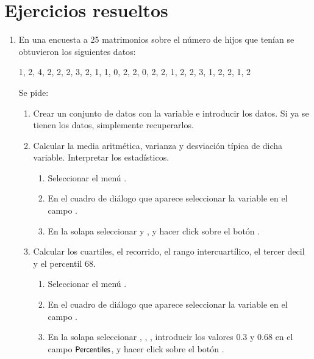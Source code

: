 \section{Ejercicios resueltos}
\begin{enumerate}[leftmargin=*]
\item En una encuesta a 25 matrimonios sobre el número de hijos que tenían se obtuvieron los siguientes datos:
\begin{center}
1, 2, 4, 2, 2, 2, 3, 2, 1, 1, 0, 2, 2, 0, 2, 2, 1, 2, 2, 3, 1, 2, 2, 1, 2
\end{center}
Se pide:
\begin{enumerate}
\item Crear un conjunto de datos con la variable  e introducir los datos. 
Si ya se tienen los datos, simplemente recuperarlos.

\item Calcular la media aritmética, varianza y desviación típica de dicha variable.
Interpretar los estadísticos. 
\begin{indicacion}
\begin{enumerate}
\item Seleccionar el menú .
\item En el cuadro de diálogo que aparece seleccionar la variable  en el campo .
\item En la solapa  seleccionar  y , y hacer
click sobre el botón .
\end{enumerate}
\end{indicacion}

\item Calcular los cuartiles, el recorrido, el rango intercuartílico, el tercer decil y el percentil 68. 
\begin{indicacion}
\begin{enumerate}
\item Seleccionar el menú .
\item En el cuadro de diálogo que aparece seleccionar la variable  en el campo .
\item En la solapa  seleccionar , , , introducir los valores $0.3$ y $0.68$ en el campo $\textsf{\small Percentiles}$, y hacer click sobre el botón
.
\end{enumerate}
\end{indicacion}
\end{enumerate}


\end{enumerate}
